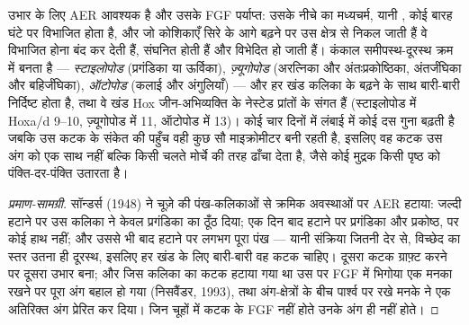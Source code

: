 \begin{proposition}\label{prop:b2:limb-organogenesis:aer}
उभार के लिए AER आवश्यक है और उसके FGF पर्याप्त: उसके नीचे का
मध्यचर्म, यानी \emph{}, कोई बारह
घंटे पर विभाजित होता है, और जो कोशिकाएँ सिरे के आगे बढ़ने पर उस क्षेत्र
से निकल जाती हैं वे विभाजित होना बंद कर देती हैं, संघनित होती हैं और
विभेदित हो जाती हैं। कंकाल समीपस्थ-दूरस्थ क्रम में बनता है ---
\emph{स्टाइलोपोड} (प्रगंडिका या ऊर्विका),
\emph{ज़्यूगोपोड} (अरत्निका और अंतःप्रकोष्ठिका, अंतर्जंघिका और
बहिर्जंघिका), \emph{ऑटोपोड} (कलाई और अंगुलियाँ) --- और हर खंड कलिका के
बढ़ने के साथ बारी-बारी निर्दिष्ट होता है, तथा वे खंड Hox जीन-अभिव्यक्ति
के नेस्टेड प्रांतों के संगत हैं (स्टाइलोपोड में Hoxa/d 9--10,
ज़्यूगोपोड में 11, ऑटोपोड में 13)। कोई  चार दिनों में
लंबाई में कोई दस गुना बढ़ती है जबकि उस कटक के संकेत की पहुँच वही कुछ सौ
माइक्रोमीटर बनी रहती है, इसलिए वह कटक उस अंग को एक साथ नहीं बल्कि किसी
चलते मोर्चे की तरह ढाँचा देता है, जैसे कोई मुद्रक किसी पृष्ठ को
पंक्ति-दर-पंक्ति उतारता है।
\end{proposition}
\begin{proof}[प्रमाण-सामग्री]
सॉन्डर्स (1948) ने चूज़े की पंख-कलिकाओं से क्रमिक अवस्थाओं पर AER हटाया:
जल्दी हटाने पर उस कलिका ने केवल प्रगंडिका का ठूँठ दिया;
एक दिन बाद हटाने पर प्रगंडिका और प्रकोष्ठ, पर कोई हाथ नहीं; और उससे भी
बाद हटाने पर लगभग पूरा पंख --- यानी संक्रिया जितनी देर से, विच्छेद का
स्तर उतना ही दूरस्थ, इसलिए हर खंड के लिए बारी-बारी वह कटक चाहिए। दूसरा
कटक ग्राफ़्ट करने पर दूसरा उभार बना; और जिस कलिका का कटक हटाया गया था
उस पर FGF में भिगोया एक मनका रखने पर पूरा अंग बहाल हो गया (निसवैंडर,
1993), तथा अंग-क्षेत्रों के बीच पार्श्व पर रखे मनके ने एक अतिरिक्त अंग
प्रेरित कर दिया। जिन चूहों में कटक के FGF नहीं होते उनके अंग ही नहीं होते।
\end{proof}

